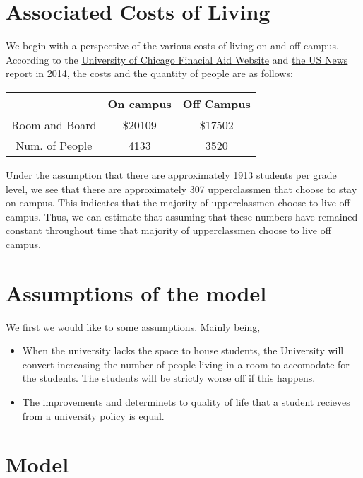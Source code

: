 \documentclass[12pt]{article}
\newcommand{\R}{\mathbb{R}}
\begin{document}
\section{Associated Costs of Living}
We begin with a perspective of the various costs of living on and off campus. According to the \href{https://financialaid.uchicago.edu/undergraduate/how-aid-works/undergraduate-costs/}{University of Chicago Finacial Aid Website} and \href{https://web.archive.org/web/20160304084033/http://colleges.usnews.rankingsandreviews.com/best-colleges/university-of-chicago-1774/student-life}{the US News report in 2014}, the costs and the quantity of people are as follows: 
\begin{table}[H]
    \centering
    \begin{tabular}{c|c|c}
        & On campus & Off Campus\\
        \hline
        Room and Board & \$20109 & \$17502\\ 
        \hline
        Num. of People & 4133 & 3520\\
        \hline
    \end{tabular}
\end{table}
Under the assumption that there are approximately 1913 students per grade level, we see that there are approximately 307 upperclassmen that choose to stay on campus. This indicates that the majority of upperclassmen choose to live off campus. Thus, we can estimate that assuming that these numbers have remained constant throughout time that majority of upperclassmen choose to live off campus. 
\section{Assumptions of the model}
We first we would like to some assumptions. Mainly being,
\begin{itemize}
    \item When the university lacks the space to house students, the University will convert increasing the number of people living in a room to accomodate for the students. The students will be strictly worse off if this happens. 
    \item The improvements and determinets to quality of life that a student recieves from a university policy is equal. 
\end{itemize}
\section{Model}
\end{document}
